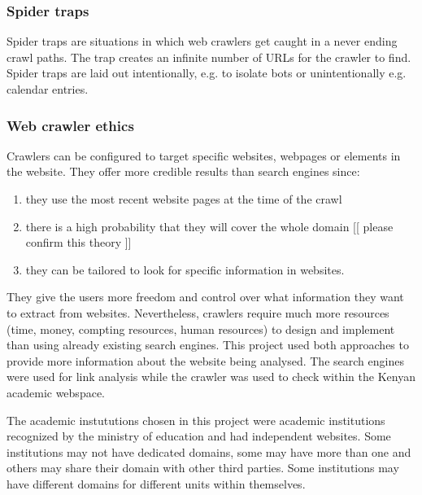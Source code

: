 \subsubsection{Spider traps}
\noindent
Spider traps are situations in which web crawlers get caught in a never ending crawl paths. The trap creates an infinite number of URLs for the crawler to find. Spider traps are laid out intentionally, e.g. to isolate bots or unintentionally e.g. calendar entries. 

\subsubsection{Web crawler ethics}

\noindent
Crawlers can be configured to target specific websites, webpages or elements in the website. They offer more credible results than search engines since:
\begin{enumerate}
\item they use the most recent website pages at the time of the crawl
\item there is a high probability that they will cover the whole domain [[ please confirm this theory ]]
\item they can be tailored to look for specific information in websites.
\end{enumerate}
\noindent
They give the users more freedom and control over what information they want to extract from
websites. Nevertheless, crawlers require much more resources (time, money, compting resources,
human resources) to design and implement than using already existing search engines.
This project used both approaches to provide more information about the website being analysed.
The search engines were used for link analysis while the crawler was used to check within the
Kenyan academic webspace.

\noindent
The academic instututions chosen in this project were academic institutions recognized by the
ministry of education and had independent websites. Some institutions may not have dedicated
domains, some may have more than one and others may share their domain with other third
parties. Some institutions may have different domains for different units within themselves.

